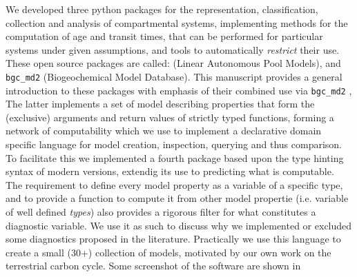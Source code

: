 We developed three python packages for the representation, classification, collection and analysis  of compartmental systems, implementing methods for the computation of age and transit times, that can be performed for particular systems under given assumptions, and tools to automatically \emph{restrict} their use.
These open source packages are called: 
\LAPM (Linear Autonomous Pool Models),
\CompartmentalSystems  and
\texttt{bgc\_md2} (Biogeochemical Model Database).
This manuscript provides a general introduction to these packages 
with emphasis of their combined use via \texttt{bgc\_md2} ,
The latter implements a set of model describing properties that form the (exclusive) arguments and return values of strictly typed functions, forming a network of computability which we use 
to implement a declarative domain specific language for model creation, inspection, querying and thus comparison.
To facilitate this we implemented a fourth package \ComputabilityGraphs based upon the  type hinting syntax of modern \python versions, extendig its use to predicting what is computable.   
The requirement to define every model property as a variable of a specific type, and to provide a function to compute it from other model propertie (i.e. variable of well defined \emph{types}) also provides a rigorous filter for what constitutes a diagnostic variable. 
We use it as such to discuss why we implemented or excluded some diagnostics proposed in the literature.
Practically we use this language to create a small
(30+) collection of models, motivated by our own work on the terrestrial carbon
cycle.  Some screenshot of the software are shown in 
